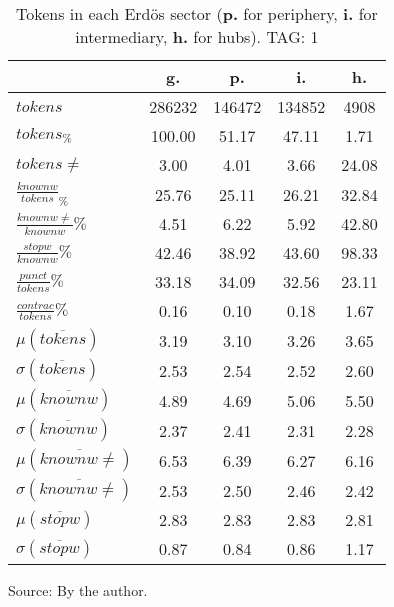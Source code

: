 \begin{table}[h!]
\begin{center}
	\caption{Tokens in each Erd\"os sector ({{\bf p.}} for periphery, {{\bf i.}} for intermediary, {{\bf h.}} for hubs). TAG: 1}\label{tab:tokensInline}
	\def\arraystretch{1.5}
\begin{tabular}{| l || c | c | c | c |}\hline
 & {\bf g.} & {\bf p.} & {\bf i.} & {\bf h.} \\\hline\hline
$tokens$ & 286232  & 146472  & 134852  & 4908 \\
$tokens_{\%}$ & 100.00  & 51.17  & 47.11  & 1.71 \\
$tokens \neq$ & 3.00  & 4.01  & 3.66  & 24.08 \\\hline
$\frac{knownw}{tokens}_\%$ & 25.76  & 25.11  & 26.21  & 32.84 \\
$\frac{knownw \neq}{knownw}\%$ & 4.51  & 6.22  & 5.92  & 42.80 \\\hline
$\frac{stopw}{knownw}\%$ & 42.46  & 38.92  & 43.60  & 98.33 \\
$\frac{punct}{tokens}\%$ & 33.18  & 34.09  & 32.56  & 23.11 \\
$\frac{contrac}{tokens}\%$ & 0.16  & 0.10  & 0.18  & 1.67 \\\hline\hline
$\mu(\overline{tokens})$ & 3.19  & 3.10  & 3.26  & 3.65 \\
$\sigma(\overline{tokens})$ & 2.53  & 2.54  & 2.52  & 2.60 \\\hline
$\mu(\overline{knownw})$ & 4.89  & 4.69  & 5.06  & 5.50 \\
$\sigma(\overline{knownw})$ & 2.37  & 2.41  & 2.31  & 2.28 \\\hline
$\mu(\overline{knownw \neq})$ & 6.53  & 6.39  & 6.27  & 6.16 \\
$\sigma(\overline{knownw \neq})$ & 2.53  & 2.50  & 2.46  & 2.42 \\\hline
$\mu(\overline{stopw})$ & 2.83  & 2.83  & 2.83  & 2.81 \\
$\sigma(\overline{stopw})$ & 0.87  & 0.84  & 0.86  & 1.17 \\\hline
\end{tabular}
\begin{flushleft}
		Source: By the author.\
\end{flushleft}
\end{center}
\end{table}

